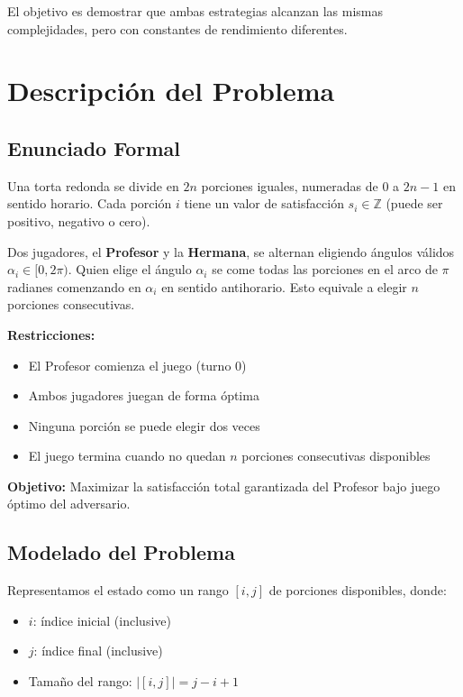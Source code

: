 \documentclass[12pt,letterpaper]{article}
\begin{document}
El objetivo es demostrar que ambas estrategias alcanzan las mismas complejidades, pero con constantes de rendimiento diferentes.

\section{Descripción del Problema}

\subsection{Enunciado Formal}

Una torta redonda se divide en $2n$ porciones iguales, numeradas de $0$ a $2n-1$ en sentido horario. Cada porción $i$ tiene un valor de satisfacción $s_i \in \mathbb{Z}$ (puede ser positivo, negativo o cero).

Dos jugadores, el \textbf{Profesor} y la \textbf{Hermana}, se alternan eligiendo ángulos válidos $\alpha_i \in [0, 2\pi)$. Quien elige el ángulo $\alpha_i$ se come todas las porciones en el arco de $\pi$ radianes comenzando en $\alpha_i$ en sentido antihorario. Esto equivale a elegir $n$ porciones consecutivas.

\textbf{Restricciones:}
\begin{itemize}
    \item El Profesor comienza el juego (turno 0)
    \item Ambos jugadores juegan de forma óptima
    \item Ninguna porción se puede elegir dos veces
    \item El juego termina cuando no quedan $n$ porciones consecutivas disponibles
\end{itemize}

\textbf{Objetivo:} Maximizar la satisfacción total garantizada del Profesor bajo juego óptimo del adversario.

\subsection{Modelado del Problema}

Representamos el estado como un rango $[i, j]$ de porciones disponibles, donde:
\begin{itemize}
    \item $i$: índice inicial (inclusive)
    \item $j$: índice final (inclusive)
    \item Tamaño del rango: $|[i,j]| = j - i + 1$
\end{itemize}
\end{document}
